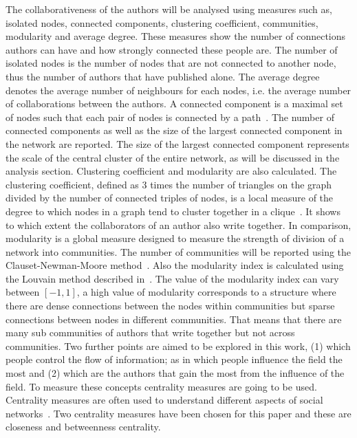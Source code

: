 \documentclass{article}
\theoremstyle{definition}
\begin{document}
The collaborativeness of the authors will be analysed using measures such as, isolated nodes,
connected components, clustering coefficient, communities, modularity and average degree.
These measures show the number of connections authors can have
and how strongly connected these people are. The number of isolated nodes is the
number of nodes that are not connected to another node, thus the
number of authors that have published alone. The average degree denotes the average
number of neighbours for each nodes, i.e. the average number of collaborations
between the authors.
A connected component is a maximal set of nodes such that each pair of nodes is
connected by a path~\cite{Easley2010}. The number of connected components as well as the size of the
largest connected component in the network are reported.
The size of the largest connected component represents the scale of the central cluster
of the entire network, as will be discussed in the analysis section.
Clustering coefficient and modularity are also calculated. The clustering
coefficient, defined as 3 times the number of triangles on the graph divided
by the number of connected triples of nodes, is a local measure of the degree to
which nodes in a graph tend to cluster together
in a clique~\cite{Easley2010}. It shows to which extent the collaborators
of an author also write together.
In comparison, modularity is a global measure designed to measure the strength of
division of a network into communities. The number of communities will be reported
using the Clauset-Newman-Moore method~\cite{clauset2004}. Also the modularity index
is calculated using the Louvain method described in~\cite{Blondel2008}. The value
of the modularity index can vary between \([-1, 1]\), a high value of modularity
corresponds to a structure where there are dense connections between the nodes within
communities but sparse connections between nodes in different communities.
That means that there are many sub communities of authors that write together
but not across communities.
Two further points are aimed to be explored in this work, (1) which people control the flow
of information;
as in which people influence the field the most and (2) which are the authors that
gain the most from the influence of the field. To measure these concepts
centrality measures are going to be used.
Centrality measures are often used to understand different
aspects of social networks~\cite{Landherr2010}. Two centrality measures have been
chosen for this paper and these are closeness and betweenness centrality.
\end{document}
